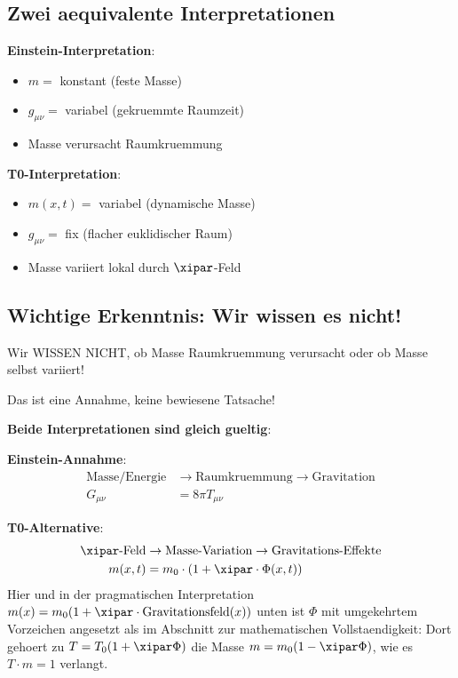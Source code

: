 	\subsection{Zwei aequivalente Interpretationen}
	
	\textbf{Einstein-Interpretation}:
	\begin{itemize}
		\item $m = $ konstant (feste Masse)
		\item $g_{\mu\nu} = $ variabel (gekruemmte Raumzeit)
		\item Masse verursacht Raumkruemmung
	\end{itemize}
	
	\textbf{T0-Interpretation}:
	\begin{itemize}
		\item $m(x,t) = $ variabel (dynamische Masse)
		\item $g_{\mu\nu} = $ fix (flacher euklidischer Raum)
		\item Masse variiert lokal durch $\xipar$-Feld
	\end{itemize}
	
	\subsection{Wichtige Erkenntnis: Wir wissen es nicht!}
	
	\begin{tcolorbox}[colback=red!5!white,colframe=red!75!black,title=Achtung - Fundamentaler Punkt]
		Wir WISSEN NICHT, ob Masse Raumkruemmung verursacht oder ob Masse selbst variiert!
		
		Das ist eine Annahme, keine bewiesene Tatsache!
	\end{tcolorbox}
	
	\textbf{Beide Interpretationen sind gleich gueltig}:
	
	\textbf{Einstein-Annahme}:
	\begin{align}
		\text{Masse/Energie} &\rightarrow \text{Raumkruemmung} \rightarrow \text{Gravitation} \\
		G_{\mu\nu} &= 8\pi T_{\mu\nu}
	\end{align}
	
	\textbf{T0-Alternative}:
	\begin{align}
		\xipar\text{-Feld} &\rightarrow \text{Masse-Variation} \rightarrow \text{Gravitations-Effekte} \\
		m(x,t) &= m_0 \cdot (1 + \xipar \cdot \Phi(x,t))
	\end{align}
	Hier und in der pragmatischen Interpretation $m(x) = m_0(1 + \xipar \cdot \text{Gravitationsfeld}(x))$ unten ist $\Phi$ mit umgekehrtem Vorzeichen angesetzt als im Abschnitt zur mathematischen Vollstaendigkeit: Dort gehoert zu $T = T_0(1 + \xipar\Phi)$ die Masse $m = m_0(1 - \xipar\Phi)$, wie es $T \cdot m = 1$ verlangt.
	
